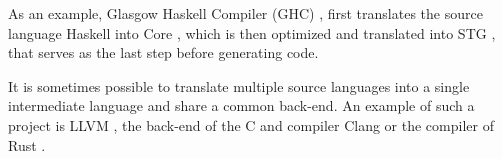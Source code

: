 As an example, Glasgow Haskell Compiler (GHC)
\cite{jones1993glasgow,haskellreport2010}, first translates the source language
Haskell into Core \cite{jones1996compiling}, which is then optimized
\cite{jones1997optimiser,santos1995compilation} and translated into STG
\cite{jones1992implementing}, that serves as the last step before generating
code.

It is sometimes possible to translate multiple source languages into a single
intermediate language and share a common back-end. An example of such a project
is LLVM \cite{llvm}, the back-end of the C and \Cplusplus{} compiler Clang
\cite{clang} or the compiler of Rust \cite{rust}.
